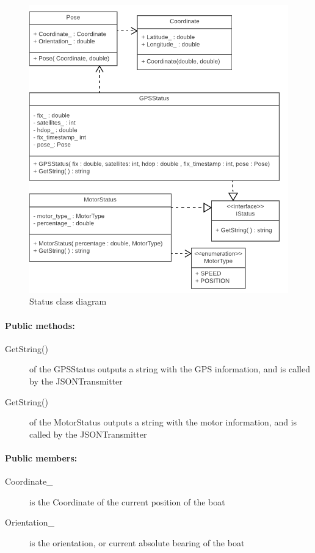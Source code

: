 \begin{figure}[H]
\centering
\includegraphics[max width=1\linewidth]{Images/Design/Status_class_diagram}
\caption{Status class diagram}
\label{fig:status}
\end{figure}

\paragraph{Public methods:}
\begin{adjustwidth}{2.5em}{0pt}\begin{description}
		\item [GetString()] of the GPSStatus outputs a string with the GPS information, and is called by the JSONTransmitter
		\item [GetString()] of the MotorStatus outputs a string with the motor information, and is called by the JSONTransmitter
\end{description}\end{adjustwidth}

\paragraph{Public members:}
\begin{adjustwidth}{2.5em}{0pt}\begin{description}
		\item [Coordinate_] is the Coordinate of the current position of the boat 
		\item [Orientation_] is the orientation, or current absolute bearing of the boat
\end{description}\end{adjustwidth}

